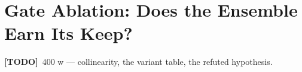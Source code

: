 \documentclass[11pt,a4paper]{report}
\newcommand{\todo}[1]{\par\noindent\textcolor{red!70!black}{\small\textbf{[TODO]}~#1}\par}
\begin{document}
\section{Gate Ablation: Does the Ensemble Earn Its Keep?}
\label{sec:eval-ablation}
\todo{400 w — collinearity, the variant table, the refuted hypothesis.}
\end{document}
